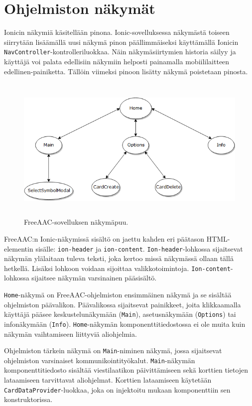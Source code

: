 \documentclass[utf8]{gradu3}
\begin{document}
\section{Ohjelmiston näkymät}

Ionicin näkymiä käsitellään pinona. Ionic-sovelluksessa näkymästä toiseen siirrytään lisäämällä uusi näkymä pinon päällimmäiseksi käyttämällä Ionicin \texttt{NavController}-kontrolleriluokkaa. Näin näkymäsiirtymien historia säilyy ja käyttäjä voi palata edellisiin näkymiin helposti painamalla mobiililaitteen edellinen-painiketta. Tällöin viimeksi pinoon lisätty näkymä poistetaan pinosta.

\begin{figure}[h]\centering
  \includegraphics[height=7cm,keepaspectratio]{FreeAACViews}
  \caption[FreeAAC-sovelluksen näkymäpuu.]
  {FreeAAC-sovelluksen näkymäpuu.}
  \label{fig:FreeAACViews}
\end{figure}

FreeAAC:n Ionic-näkymissä sisältö on jaettu kahden eri päätason HTML-elementin sisälle: \texttt{ion-header} ja \texttt{ion-content}. \texttt{Ion-header}-lohkossa sijaitsevat näkymän ylälaitaan tuleva teksti, joka kertoo missä näkymässä ollaan tällä hetkellä. Lisäksi lohkoon voidaan sijoittaa valikkotoimintoja. \texttt{Ion-content}-lohkossa sijaitsee näkymän varsinainen pääsisältö.

\texttt{Home}-näkymä on FreeAAC-ohjelmiston ensimmäinen näkymä ja se sisältää ohjelmiston päävalikon. Päävalikossa sijaitsevat painikkeet, joita klikkaamalla käyttäjä pääsee keskustelunäkymään (\texttt{Main}), asetusnäkymään (\texttt{Options}) tai infonäkymään (\texttt{Info}). \texttt{Home}-näkymän komponenttitiedostossa ei ole muita kuin näkymän vaihtamiseen liittyviä aliohjelmia.

Ohjelmiston tärkein näkymä on \texttt{Main}-niminen näkymä, jossa sijaitsevat ohjelmiston varsinaiset kommunikointityökalut. \texttt{Main}-näkymän komponenttitiedosto sisältää viestilaatikon päivittämiseen sekä korttien tietojen lataamiseen tarvittavat aliohjelmat. Korttien lataamiseen käytetään \texttt{CardDataProvider}-luokkaa, joka on injektoitu mukaan komponenttiin sen konstruktorissa.
\end{document}
